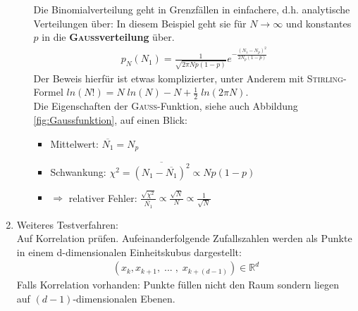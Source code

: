 \documentclass[12pt]{article}
\begin{document}
\begin{enumerate}
\begin{itemize}
Die Binomialverteilung geht in Grenzfällen in einfachere, d.h. analytische Verteilungen über: In diesem Beispiel geht sie für $N \to \infty$ und konstantes $p$ in die \textbf{\textsc{Gauss}verteilung} über.
\begin{align}
p_N (N_1) = \frac{1}{\sqrt{2 \pi N p (1-p)}} e^{- \frac{(N_1 - N_p)^2}{2 N_p (1-p)}}
\end{align}
Der Beweis hierfür ist etwas komplizierter, unter Anderem mit \textsc{Stirling}-Formel $ln(N!) = N \; ln(N) - N + \frac{1}{2} \; ln( 2 \pi N)$. \\
Die Eigenschaften der \textsc{Gauß}-Funktion, siehe auch Abbildung \ref{fig:Gaussfunktion}, auf einen Blick:
\begin{itemize}
\item Mittelwert: $\overline{N_1}= N_p$
\item Schwankung: $\chi ^2 = \overline{(N_1 - \overline{N_1})^2} \propto N p (1-p)$ 
\item $\Rightarrow$ relativer Fehler: $\frac{\sqrt{\chi ^2}}{\overline{N_1}} \propto \frac{\sqrt{N}}{N} \propto \frac{1}{\sqrt{N}}$ 
\end{itemize}
\end{itemize}
\item Weiteres Testverfahren: \\
Auf Korrelation prüfen. Aufeinanderfolgende Zufallszahlen werden als Punkte in einem d-dimensionalen Einheitskubus dargestellt:
\begin{align}
(x_k, x_{k+1}, \; ...\; ,\; x_{k+(d-1)}) \in \mathbb{R}^d
\end{align}
Falls Korrelation vorhanden: Punkte füllen nicht den Raum sondern liegen auf $(d-1)$-dimensionalen Ebenen. \\


\end{enumerate}
\end{document}
